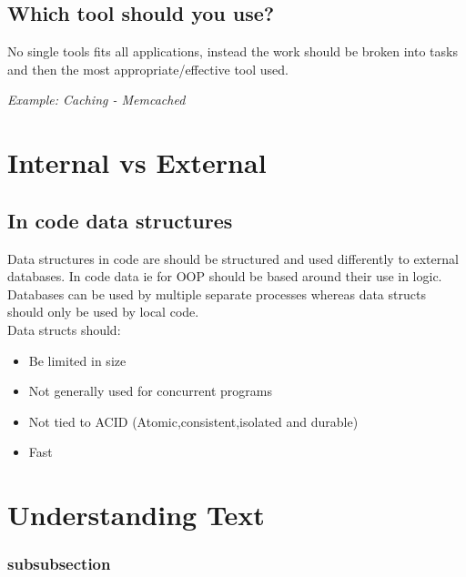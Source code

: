 \documentclass[11pt]{scrartcl} %
\begin{document}
\subsection{Which tool should you use?}

No single tools fits all applications, instead the work should be broken into tasks
and then the most appropriate/effective tool used. 

\textit{Example: Caching - Memcached}

\section{Internal vs External}

\subsection{In code data structures}

Data structures in code are should be structured and used differently to external databases. In code
data ie for OOP should be based around their use in logic. Databases can be used by multiple separate
processes whereas data structs should only be used by local code.\\

Data structs should:

\begin{itemize}
	\item Be limited in size
	\item Not generally used for concurrent programs
	\item Not tied to ACID (Atomic,consistent,isolated and durable)
	\item Fast
\end{itemize}

\section{Understanding Text}

\subsubsection{subsubsection}


\end{document}
